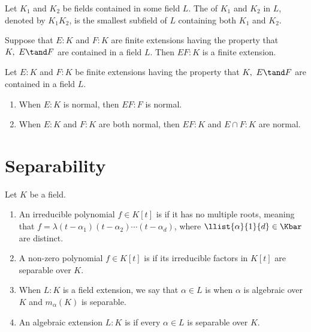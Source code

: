 \documentclass{article}
\begin{document}
  \begin{tdefinition}[Compositum]
    Let \( K_1 \) and \( K_2 \) be fields contained in some field \( L \).
    The  of \( K_1 \) and \( K_2 \) in \( L \), denoted by \( K_1K_2 \), is the smallest subfield of \( L \) containing both \( K_1 \) and \( K_2 \).
  \end{tdefinition}

  \begin{tproposition}
    Suppose that \( E:K \) and \( F:K \) are finite extensions having the property that \( K,\ E\tand F \) are contained in a field \( L \).
    Then \( EF:K \) is a finite extension.
  \end{tproposition}

  \begin{ttheorem}
    Let \( E:K \) and \( F:K \) be finite extensions having the property that \( K,\ E\tand F \) are contained in a field \( L \).
    \begin{enumerate}[label=(\alph*)]
      \item When \( E:K \) is normal, then \( EF:F \) is normal.
      \item When \( E:K \) and \( F:K \) are both normal, then \( EF:K \) and \( E\cap F:K \) are normal.
    \end{enumerate}
  \end{ttheorem}


\section{Separability} %
\setcounter{tdefinition}{24}
  \begin{tdefinition}[Separable]
    Let \( K \) be a field.
    \begin{enumerate}[label=(\roman*)]
      \item An irreducible polynomial \( f\in K[t] \) is  if it has no multiple roots, meaning that \( f=\lambda(t-\alpha_1)(t-\alpha_2)\cdots(t-\alpha_d) \), where \( \llist{\alpha}{1}{d}\in \Kbar \) are distinct.
      \item A non-zero polynomial \( f\in K[t] \) is  if its irreducible factors in \( K[t] \) are separable over \( K \).
      \item When \( L:K \) is a field extension, we say that \( \alpha \in L \) is  when \( \alpha \) is algebraic over \( K \) and \( m_\alpha(K) \) is separable.
      \item An algebraic extension \( L:K \) is  if every \( \alpha\in L \) is separable over \( K \).
    \end{enumerate}
  \end{tdefinition}
\end{document}
